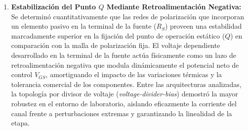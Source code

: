 \documentclass[conference]{IEEEtran}
\begin{document}
\begin{enumerate}
    \item \textbf{Estabilización del Punto $Q$ Mediante Retroalimentación Negativa:} Se determinó cuantitativamente que las redes de polarización que incorporan un elemento pasivo en la terminal de la fuente ($R_S$) proveen una estabilidad marcadamente superior en la fijación del punto de operación estático ($Q$) en comparación con la malla de polarización fija. El voltaje dependiente desarrollado en la terminal de la fuente actúa físicamente como un lazo de retroalimentación negativa que modula dinámicamente el potencial neto de control $V_{GS}$, amortiguando el impacto de las variaciones térmicas y la tolerancia comercial de los componentes. Entre las arquitecturas analizadas, la topología por divisor de voltaje (\textit{voltage-divider-bias}) demostró la mayor robustez en el entorno de laboratorio, aislando eficazmente la corriente del canal frente a perturbaciones extremas y garantizando la linealidad de la etapa.
\end{enumerate}

\printbibliography{}
\end{document}
